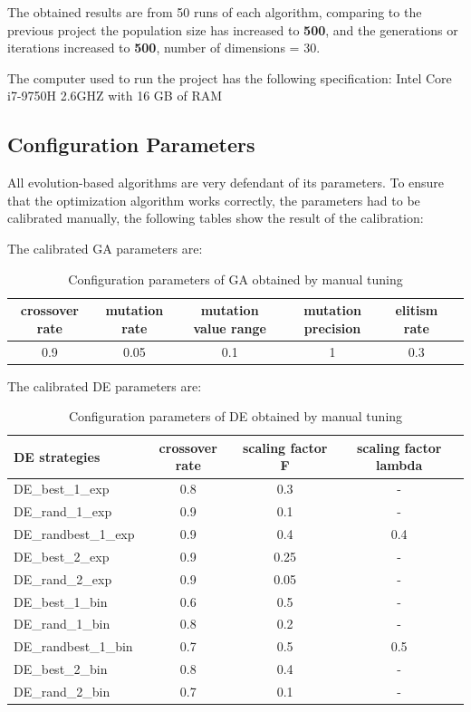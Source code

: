 \documentclass[12pt]{article}
\begin{document}
    The obtained results are from 50 runs of each algorithm, comparing to the previous project the population size has increased to \textbf{500}, and the generations or iterations increased to \textbf{500}, number of dimensions = 30.

The computer used to run the project has the following specification: Intel Core i7-9750H 2.6GHZ with 16 GB of RAM

  
      
\subsection{Configuration Parameters}
All evolution-based algorithms are very defendant of its parameters. To ensure that the optimization algorithm works correctly,  the parameters had to be calibrated manually,
the following tables show the result of the calibration:






The calibrated GA parameters are:
\begin{table}[H]    
\centering
\footnotesize
\begin{tabular}{cccccc}

\hline
crossover rate&    mutation rate&    mutation value range&     mutation precision&     elitism rate\\
\hline

0.9&    0.05&    0.1&    1&    0.3&\\

\hline 
\end{tabular} 

\caption{Configuration parameters of GA obtained by manual tuning} 
\end{table}



The calibrated DE parameters are:

\begin{table}[H]    
\centering
\small 
\begin{tabular}{lccc}

\hline
DE strategies & crossover rate& scaling factor F& scaling factor lambda\\
\hline 
DE\_best\_1\_exp & 0.8 &    0.3&    - \\
DE\_rand\_1\_exp& 0.9&    0.1&    - \\
DE\_randbest\_1\_exp& 0.9&    0.4&    0.4 \\
DE\_best\_2\_exp& 0.9&    0.25&    - \\
DE\_rand\_2\_exp& 0.9&    0.05&    - \\
DE\_best\_1\_bin& 0.6&    0.5&    - \\
DE\_rand\_1\_bin& 0.8&    0.2&    - \\
DE\_randbest\_1\_bin& 0.7&    0.5&    0.5\\
DE\_best\_2\_bin& 0.8&    0.4&    - \\
DE\_rand\_2\_bin& 0.7&    0.1&    - \\
\hline 
\end{tabular} 
\caption{Configuration parameters of DE obtained by manual tuning} 
\end{table}
\end{document}
